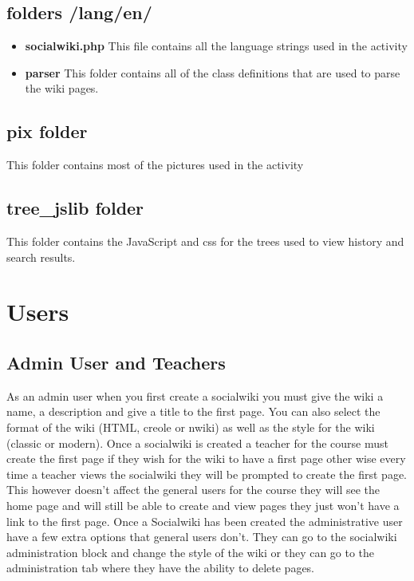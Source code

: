\documentclass[letterpaper,twoside,11pt]{article}
\begin{document}
	\subsection{folders /lang/en/}
\begin{itemize}
	\item \textbf{socialwiki.php}
	This file contains all the language strings used in the activity
	\item \textbf{parser}
	This folder contains all of the class definitions that are used to parse the wiki pages.
\end{itemize}
\subsection{pix folder}
	This folder contains most of the pictures used in the activity
	\subsection{tree\_jslib folder}
	This folder contains the JavaScript and css for the trees used to view history and search results.
	
	
	\section{Users}
	\subsection{Admin User and Teachers}
	As an admin user when you first create a socialwiki you must give the wiki a name, a description and give a title to the first page. You can also select the format of the wiki (HTML, creole or nwiki) as well as the style for the wiki (classic or modern). Once a socialwiki is created a teacher for the course must create the first page if they wish for the wiki to have a first page other wise every time a teacher views the socialwiki they will be prompted to create the first page. This however doesn't affect the general users for the course they will see the home page and will still be able to create and view pages they just won't have a link to the first page.
	Once a Socialwiki has been created the administrative user have a few extra options that general users don't. They can go to the socialwiki administration block and change the style of the wiki or they can go to the administration tab where they have the ability to delete pages.
\end{document}
